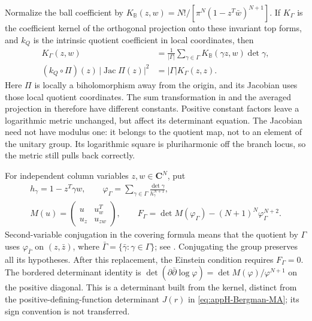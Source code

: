 Normalize the ball coefficient by
$K_{\mathbb B}(z,w)=N!/[\pi^N(1-z^T\bar w)^{N+1}]$.
If $K_\Gamma$ is the coefficient kernel of the orthogonal
projection onto these invariant top forms, and $k_Q$ is the
intrinsic quotient coefficient in local coordinates, then
\begin{equation*}
 \begin{aligned}
 K_\Gamma(z,w)
   &=\frac1{|\Gamma|}\sum_{\gamma\in\Gamma}
         K_{\mathbb B}(\gamma z,w)\det\gamma,\\
 (k_Q\circ\Pi)(z)\,|\operatorname{Jac}\Pi(z)|^2
   &=|\Gamma|K_\Gamma(z,z).
 \end{aligned}
 \tag{H.41}\label{eq:appH-ball-quotient-transform}
\end{equation*}
Here $\Pi$ is locally a biholomorphism away from the origin,
and its Jacobian uses those local quotient coordinates.
The sum transformation in
\cite[Theorem~2.3]{EbenfeltXiaoXu21BallQuotientsAdvance}
and the averaged projection in
\cite[Lemma~5.1]{HuangLiBergmanSteinAuthorCopy}
therefore have different constants. Positive constant factors
leave a logarithmic metric unchanged, but affect its determinant
equation. The Jacobian need not have modulus one: it belongs
to the quotient map, not to an element of the unitary group.
Its logarithmic square is pluriharmonic off the branch locus,
so the metric still pulls back correctly.

For independent column variables $z,w\in\mathbf C^N$, put
\begin{equation*}
 \begin{gathered}
 h_\gamma=1-z^T\gamma w,\qquad
 \varphi_\Gamma=\sum_{\gamma\in\Gamma}
                \frac{\det\gamma}{h_\gamma^{N+1}},\\
 M(u)=\begin{pmatrix}u&u_w^T\\u_z&u_{zw}\end{pmatrix},\qquad
 F_\Gamma=\det M(\varphi_\Gamma)
                  -(N+1)^N\varphi_\Gamma^{N+2}.
 \end{gathered}
 \tag{H.42}\label{eq:appH-ball-quotient-rational}
\end{equation*}
Second-variable conjugation in the covering formula means that
the quotient by $\Gamma$ uses $\varphi_{\bar\Gamma}$ on
$(z,\bar z)$, where $\bar\Gamma=\{\bar\gamma:\gamma\in\Gamma\}$;
see \cite[Proposition~2.1]{GangulySahi26BallQuotientsV1}.
Conjugating the group preserves all its hypotheses. After this
replacement, the Einstein condition requires $F_\Gamma=0$.
The bordered determinant identity is
$\det(\partial\bar\partial\log\varphi)
=\det M(\varphi)/\varphi^{N+1}$ on the positive diagonal.
This is a determinant built from the kernel, distinct from the
positive-defining-function determinant $J(r)$ in
\eqref{eq:appH-Bergman-MA}; its sign convention is not transferred.

